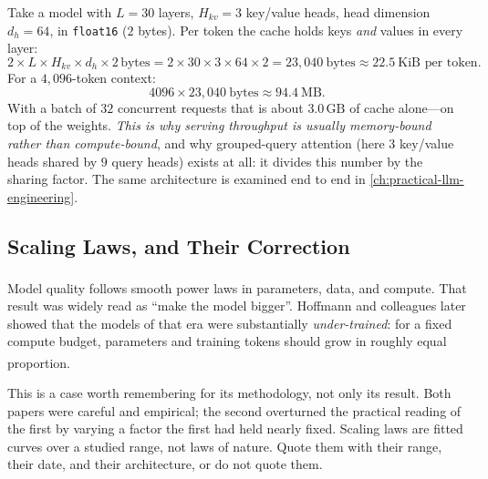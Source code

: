 \begin{workedexample}
Take a model with $L = 30$ layers, $H_{kv} = 3$ key/value heads, head dimension
$d_h = 64$, in \texttt{float16} ($2$ bytes). Per token the cache holds keys
\emph{and} values in every layer:
\[
  2 \times L \times H_{kv} \times d_h \times 2\,\text{bytes}
  = 2 \times 30 \times 3 \times 64 \times 2
  = 23{,}040\ \text{bytes} \approx 22.5\ \text{KiB per token.}
\]
For a $4{,}096$-token context:
\[
  4096 \times 23{,}040\ \text{bytes} \approx 94.4\ \text{MB.}
\]
With a batch of $32$ concurrent requests that is about $3.0\,\text{GB}$ of cache
alone---on top of the weights. \emph{This is why serving throughput is usually
memory-bound rather than compute-bound}, and why grouped-query attention (here
$3$ key/value heads shared by $9$ query heads) exists at all: it divides this
number by the sharing factor. The same architecture is examined end to end in
\cref{ch:practical-llm-engineering}.
\end{workedexample}

\subsection{Scaling Laws, and Their Correction}

Model quality follows smooth power laws in parameters, data, and
compute\textsuperscript{\cite{kaplanScalingLawsNeural2020}}. That result was
widely read as ``make the model bigger''. Hoffmann and colleagues later showed
that the models of that era were substantially
\emph{under-trained}: for a fixed compute budget, parameters and training tokens
should grow in roughly equal
proportion\textsuperscript{\cite{hoffmannTrainingComputeOptimal2022}}.

\begin{engineernote}
This is a case worth remembering for its methodology, not only its result. Both
papers were careful and empirical; the second overturned the practical reading
of the first by varying a factor the first had held nearly fixed. Scaling laws
are fitted curves over a studied range, not laws of nature. Quote them with
their range, their date, and their architecture, or do not quote them.
\end{engineernote}

